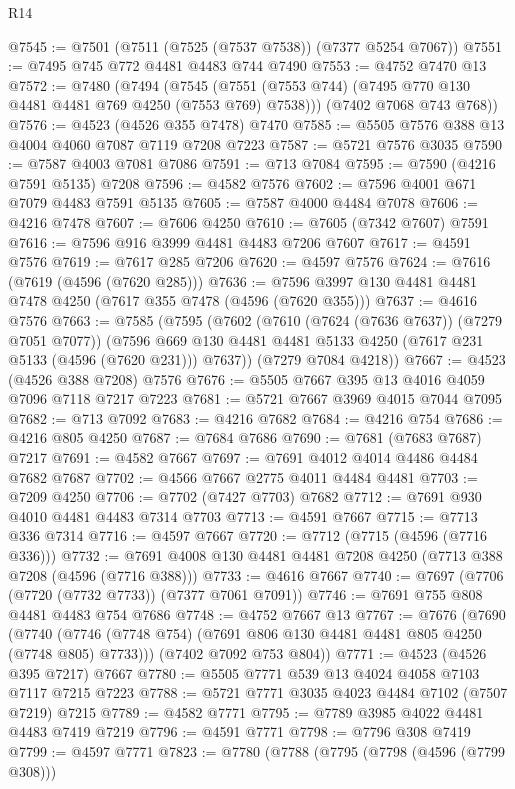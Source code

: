 \begin{lexlean}{R14}
\begin{coremodule}
@7545 := @7501 (@7511 (@7525 (@7537 @7538)) (@7377 @5254 @7067))
@7551 := @7495 @745 @772 @4481 @4483 @744 @7490
@7553 := @4752 @7470 @13
@7572 := @7480
    (@7494
      (@7545 (@7551 (@7553 @744) (@7495 @770 @130 @4481 @4481 @769 @4250 (@7553 @769) @7538)))
      (@7402 @7068 @743 @768))
@7576 := @4523 (@4526 @355 @7478) @7470
@7585 := @5505 @7576 @388 @13 @4004 @4060 @7087 @7119 @7208 @7223
@7587 := @5721 @7576 @3035
@7590 := @7587 @4003 @7081 @7086
@7591 := @713 @7084
@7595 := @7590 (@4216 @7591 @5135) @7208
@7596 := @4582 @7576
@7602 := @7596 @4001 @671 @7079 @4483 @7591 @5135
@7605 := @7587 @4000 @4484 @7078
@7606 := @4216 @7478
@7607 := @7606 @4250
@7610 := @7605 (@7342 @7607) @7591
@7616 := @7596 @916 @3999 @4481 @4483 @7206 @7607
@7617 := @4591 @7576
@7619 := @7617 @285 @7206
@7620 := @4597 @7576
@7624 := @7616 (@7619 (@4596 (@7620 @285)))
@7636 := @7596 @3997 @130 @4481 @4481 @7478 @4250 (@7617 @355 @7478 (@4596 (@7620 @355)))
@7637 := @4616 @7576
@7663 := @7585
    (@7595
      (@7602
        (@7610 (@7624 (@7636 @7637)) (@7279 @7051 @7077))
        (@7596 @669 @130 @4481 @4481 @5133 @4250 (@7617 @231 @5133 (@4596 (@7620 @231))) @7637))
      (@7279 @7084 @4218))
@7667 := @4523 (@4526 @388 @7208) @7576
@7676 := @5505 @7667 @395 @13 @4016 @4059 @7096 @7118 @7217 @7223
@7681 := @5721 @7667 @3969 @4015 @7044 @7095
@7682 := @713 @7092
@7683 := @4216 @7682
@7684 := @4216 @754
@7686 := @4216 @805 @4250
@7687 := @7684 @7686
@7690 := @7681 (@7683 @7687) @7217
@7691 := @4582 @7667
@7697 := @7691 @4012 @4014 @4486 @4484 @7682 @7687
@7702 := @4566 @7667 @2775 @4011 @4484 @4481
@7703 := @7209 @4250
@7706 := @7702 (@7427 @7703) @7682
@7712 := @7691 @930 @4010 @4481 @4483 @7314 @7703
@7713 := @4591 @7667
@7715 := @7713 @336 @7314
@7716 := @4597 @7667
@7720 := @7712 (@7715 (@4596 (@7716 @336)))
@7732 := @7691 @4008 @130 @4481 @4481 @7208 @4250 (@7713 @388 @7208 (@4596 (@7716 @388)))
@7733 := @4616 @7667
@7740 := @7697 (@7706 (@7720 (@7732 @7733)) (@7377 @7061 @7091))
@7746 := @7691 @755 @808 @4481 @4483 @754 @7686
@7748 := @4752 @7667 @13
@7767 := @7676
    (@7690
      (@7740 (@7746 (@7748 @754) (@7691 @806 @130 @4481 @4481 @805 @4250 (@7748 @805) @7733)))
      (@7402 @7092 @753 @804))
@7771 := @4523 (@4526 @395 @7217) @7667
@7780 := @5505 @7771 @539 @13 @4024 @4058 @7103 @7117 @7215 @7223
@7788 := @5721 @7771 @3035 @4023 @4484 @7102 (@7507 @7219) @7215
@7789 := @4582 @7771
@7795 := @7789 @3985 @4022 @4481 @4483 @7419 @7219
@7796 := @4591 @7771
@7798 := @7796 @308 @7419
@7799 := @4597 @7771
@7823 := @7780
    (@7788
      (@7795
        (@7798 (@4596 (@7799 @308)))

\end{coremodule}
\end{lexlean}
